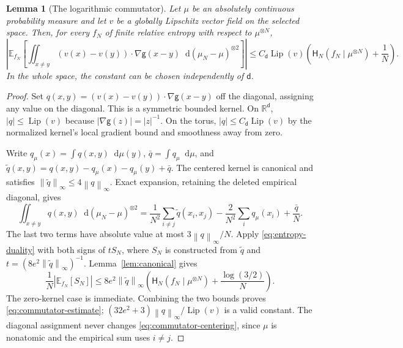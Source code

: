 \documentclass[11pt,reqno]{amsart}
\numberwithin{equation}{section}
\newtheorem{lemma}[lemma]{Lemma}
\theoremstyle{definition}
\theoremstyle{remark}
\newcommand{\R}{\mathbb R}
\newcommand{\E}{\mathbb E}
\newcommand{\g}{\mathsf g}
\renewcommand{\d}{\mathsf d}
\newcommand{\Hr}{\mathsf H}
\newcommand{\Lip}{\operatorname{Lip}}
\newcommand{\dd}{\mathop{}\!\mathrm d}
\newcommand{\norm}[1]{\left\lVert#1\right\rVert}
\newcommand{\abs}[1]{\left\lvert#1\right\rvert}
\begin{document}
\begin{lemma}[The logarithmic commutator]\label{lem:commutator}
Let $\mu$ be an absolutely continuous probability measure and let $v$ be a globally Lipschitz vector field on the selected space. Then, for every $f_N$ of finite relative entropy with respect to $\mu^{\otimes N}$,
\begin{equation}\label{eq:commutator-estimate}
 \abs{\E_{f_N}\!\left[\iint_{x\ne y}
 (v(x)-v(y))\cdot\nabla\g(x-y)\dd(\mu_N-\mu)^{\otimes2}\right]}
 \leq C_\d\Lip(v)\left(\Hr_N(f_N\mid\mu^{\otimes N})+\frac1N\right).
\end{equation}
In the whole space, the constant can be chosen independently of $\d$.
\end{lemma}
\begin{proof}
Set $q(x,y)=(v(x)-v(y))\cdot\nabla\g(x-y)$ off the diagonal, assigning any value on the diagonal. This is a symmetric bounded kernel. On $\R^\d$, $|q|\leq\Lip(v)$ because $|\nabla\g(z)|=|z|^{-1}$. On the torus, $|q|\leq C_\d\Lip(v)$ by the normalized kernel's local gradient bound and smoothness away from zero.

Write $q_\mu(x)=\int q(x,y)\dd\mu(y)$, $\bar q=\int q_\mu\dd\mu$, and $\widetilde q(x,y)=q(x,y)-q_\mu(x)-q_\mu(y)+\bar q$. The centered kernel is canonical and satisfies $\norm{\widetilde q}_\infty\leq4\norm q_\infty$. Exact expansion, retaining the deleted empirical diagonal, gives
\begin{equation}\label{eq:commutator-centering}
 \iint_{x\ne y}q(x,y)\dd(\mu_N-\mu)^{\otimes2}
 =\frac1{N^2}\sum_{i\ne j}\widetilde q(x_i,x_j)
       -\frac2{N^2}\sum_i q_\mu(x_i)+\frac{\bar q}{N}.
\end{equation}
The last two terms have absolute value at most $3\norm q_\infty/N$. Apply \eqref{eq:entropy-duality} with both signs of $tS_N$, where $S_N$ is constructed from $\widetilde q$ and $t=(8e^2\norm{\widetilde q}_\infty)^{-1}$. Lemma~\ref{lem:canonical} gives
\begin{equation}\label{eq:entropic-canonical}
 \frac1N|\E_{f_N}[S_N]|
 \leq8e^2\norm{\widetilde q}_\infty
          \left(\Hr_N(f_N\mid\mu^{\otimes N})+\frac{\log(3/2)}N\right).
\end{equation}
The zero-kernel case is immediate. Combining the two bounds proves \eqref{eq:commutator-estimate}; $(32e^2+3)\norm q_\infty/\Lip(v)$ is a valid constant. The diagonal assignment never changes \eqref{eq:commutator-centering}, since $\mu$ is nonatomic and the empirical sum uses $i\ne j$.
\end{proof}
\end{document}
